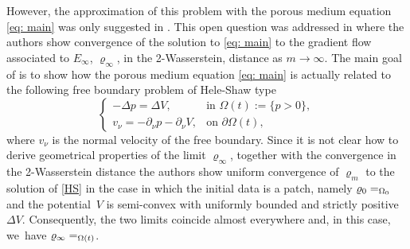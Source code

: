 \documentclass[11pt]{article}
\makeatletter
\numberwithin{equation}{section}
\DeclareRobustCommand{\mathbbm}[1]{\csname jepbb@#1\endcsname}
\let\mathds\mathbbm
\theoremstyle{plain}
\theoremstyle{remark}
\makeatother
\begin{document}
However, the approximation of this problem with the porous medium equation \eqref{eq: main} was only suggested in \cite{MRSV2011, MRS2010}. This open question was addressed in \cite{AKY14} where the authors show convergence of the solution to \eqref{eq: main} to the gradient flow associated to $E_\infty$, $\varrho_\infty$, in the 2-Wasserstein, distance as $m\to\infty$. The main goal of \cite{AKY14} is to show how the porous medium equation \eqref{eq: main} is actually related to the following free boundary problem of Hele-Shaw type
\begin{equation}\label{HS}
\begin{cases}
-\Delta p = \Delta V, &\text{in } \Omega(t):=\{p>0\},\\
v_\nu= -\partial_\nu p -\partial_\nu V, &\text{on } \partial\Omega(t),
\end{cases}
\end{equation}
where $v_\nu$ is the normal velocity of the free boundary. Since it is not clear how to derive geometrical properties of the limit $\varrho_\infty$, together with the convergence in the 2-Wasserstein distance the authors show uniform convergence of $\varrho_m$ to the solution of \eqref{HS} in the case in which the initial data is a patch, namely $\varrho_0=\mathds{1}_{\Omega_0}$ and the potential~$V$ is semi-convex with uniformly bounded and strictly positive $\Delta V$. Consequently, the two limits coincide almost everywhere and, in this case, we~have $\varrho_\infty=\mathds{1}_{\Omega(t)}$.
\end{document}
